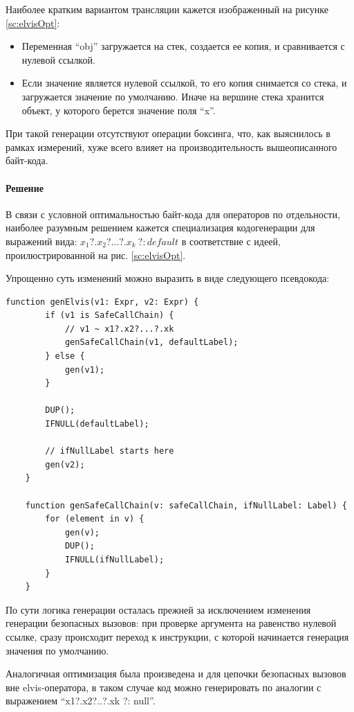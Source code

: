 Наиболее кратким вариантом трансляции кажется изображенный на рисунке \ref{sc:elvisOpt}:
\begin{itemize}
    \item Переменная ``obj'' загружается на стек, создается ее копия, и сравнивается с нулевой
    ссылкой.
    \item Если значение является нулевой ссылкой, то его копия снимается со стека, и загружается
    значение по умолчанию.
    Иначе на вершине стека хранится объект, у которого берется значение поля ``x''.
\end{itemize}

При такой генерации отсутствуют операции боксинга, что, как выяснилось в рамках измерений,
хуже всего влияет на производительность вышеописанного байт-кода.

\paragraph{Решение}
В связи с условной оптимальностью байт-кода для операторов по отдельности, наиболее разумным
решением кажется специализация кодогенерации для выражений вида: $x_1?.x_2?...?.x_k\ ?: default$
в соответствие с идеей, проилюстрированной на рис. \ref{sc:elvisOpt}.

Упрощенно суть изменений можно выразить в виде следующего псевдокода:
\begin{lstlisting}[frame=single]
    function genElvis(v1: Expr, v2: Expr) {
        if (v1 is SafeCallChain) {
            // v1 ~ x1?.x2?...?.xk
            genSafeCallChain(v1, defaultLabel);
        } else {
            gen(v1);
        }

        DUP();
        IFNULL(defaultLabel);

        // ifNullLabel starts here
        gen(v2);
    }

    function genSafeCallChain(v: safeCallChain, ifNullLabel: Label) {
        for (element in v) {
            gen(v);
            DUP();
            IFNULL(ifNullLabel);
        }
    }
\end{lstlisting}

По сути логика генерации осталась прежней за исключением изменения генерации безопасных вызовов:
при проверке аргумента на равенство нулевой ссылке, сразу происходит переход к инструкции,
с которой начинается генерация значения по умолчанию.

Аналогичная оптимизация была произведена и для цепочки безопасных вызовов вне elvis-оператора,
в таком случае код можно генерировать по аналогии с выражением ``x1?.x2?..?.xk ?: null''.

